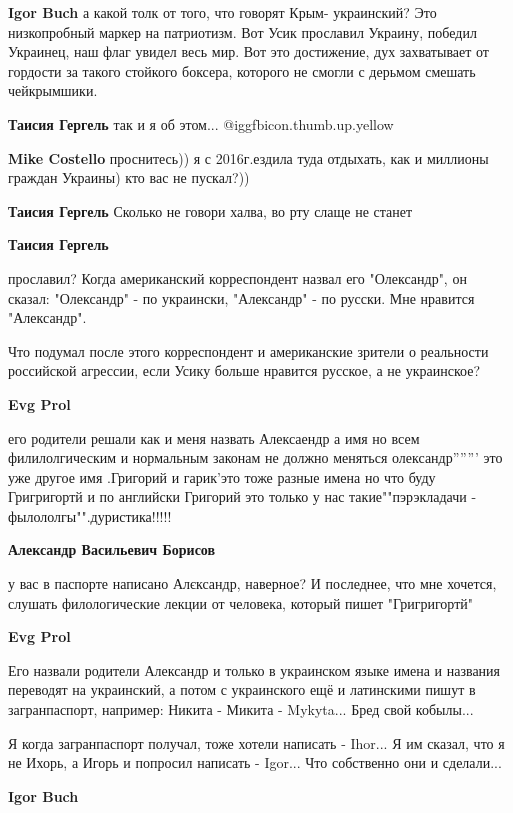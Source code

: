 \begin{itemize}
\begin{itemize}
\textbf{Igor Buch} а какой толк от того, что говорят Крым- украинский? Это низкопробный маркер на патриотизм. Вот Усик прославил Украину, победил Украинец, наш флаг увидел весь мир. Вот это достижение, дух захватывает от гордости за такого стойкого боксера, которого не смогли с дерьмом смешать чейкрымшики.

\textbf{Таисия Гергель} так и я об этом...  @igg{fbicon.thumb.up.yellow} 

\textbf{Mike Costello} проснитесь)) я с 2016г.ездила туда отдыхать, как и миллионы граждан Украины) кто вас не пускал?))

\textbf{Таисия Гергель} Сколько не говори халва, во рту слаще не станет

\textbf{Таисия Гергель} 

прославил? Когда американский корреспондент назвал его "Олександр", он сказал:
"Олександр" - по украински, "Александр" - по русски. Мне нравится "Александр".

Что подумал после этого корреспондент и американские зрители о реальности
российской агрессии, если Усику больше нравится русское, а не украинское?

\textbf{Evg Prol} 

его родители решали как и меня назвать Алексаендр а имя но всем филилолгическим
и нормальным законам не должно меняться олександр''''''' это уже другое имя
.Григорий и гарик'это тоже разные имена но что буду Григригортй и по английски
Григорий это только у нас такие""пэрэкладачи - фылололгы"".дуристика!!!!!

\textbf{Александр Васильевич Борисов} 

у вас в паспорте написано Алєксандр, наверное? И последнее, что мне хочется,
слушать филологические лекции от человека, который пишет "Григригортй"

\textbf{Evg Prol} 

Его назвали родители Александр и только в украинском языке имена и названия
переводят на украинский, а потом с украинского ещё и латинскими пишут в
загранпаспорт, например: Никита - Микита - Mykyta... Бред свой кобылы...

Я когда загранпаспорт получал, тоже хотели написать - Ihor... Я им сказал, что
я не Ихорь, а Игорь и попросил написать - Igor... Что собственно они и
сделали...

\textbf{Igor Buch} 


\end{itemize}
\end{itemize}
